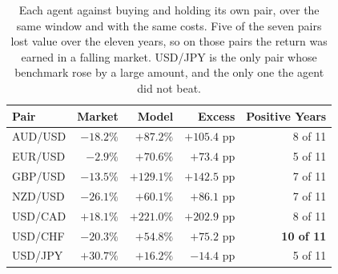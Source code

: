 \begin{table}[htb!]
\centering
\footnotesize
\caption{Each agent against buying and holding its own pair, over the same window and with the same costs. Five of the seven pairs lost value over the eleven years, so on those pairs the return was earned in a falling market. USD/JPY is the only pair whose benchmark rose by a large amount, and the only one the agent did not beat.}
\label{Tables:Benchmark}
\begin{tabular}{@{}lrrrr@{}}
\toprule
\textbf{Pair} & \textbf{Market} & \textbf{Model} & \textbf{Excess} & \textbf{Positive Years} \\
\midrule
AUD/USD & $-18.2\%$ & $+87.2\%$ & $+105.4$ pp & 8 of 11 \\
EUR/USD & $-2.9\%$ & $+70.6\%$ & $+73.4$ pp & 5 of 11 \\
GBP/USD & $-13.5\%$ & $+129.1\%$ & $+142.5$ pp & 7 of 11 \\
NZD/USD & $-26.1\%$ & $+60.1\%$ & $+86.1$ pp & 7 of 11 \\
USD/CAD & $+18.1\%$ & $+221.0\%$ & $+202.9$ pp & 8 of 11 \\
USD/CHF & $-20.3\%$ & $+54.8\%$ & $+75.2$ pp & \textbf{10 of 11} \\
USD/JPY & $+30.7\%$ & $+16.2\%$ & $\mathbf{-14.4}$ pp & 5 of 11 \\
\bottomrule
\end{tabular}
\end{table}